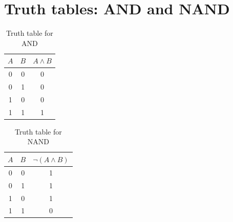 \documentclass{scrartcl}
\begin{document}
\section*{Truth tables: AND and NAND}

\begin{table}[h]
\centering
\caption{Truth table for AND}
\begin{tabular}{cc c}
\toprule
$A$ & $B$ & $A \land B$ \\
\midrule
0 & 0 & 0 \\
0 & 1 & 0 \\
1 & 0 & 0 \\
1 & 1 & 1 \\
\bottomrule
\end{tabular}
\end{table}

\begin{table}[h]
\centering
\caption{Truth table for NAND}
\begin{tabular}{cc c}
\toprule
$A$ & $B$ & $\neg(A \land B)$ \\
\midrule
0 & 0 & 1 \\
0 & 1 & 1 \\
1 & 0 & 1 \\
1 & 1 & 0 \\
\bottomrule
\end{tabular}
\end{table}
\end{document}
